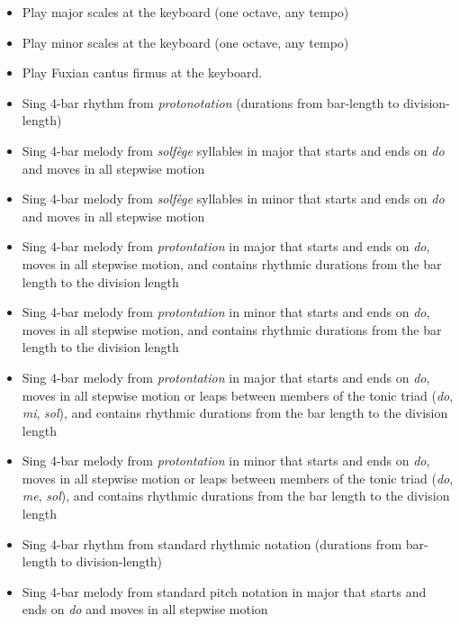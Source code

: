 \begin{itemize}
\item Play major scales at the keyboard (one octave, any tempo)

\item Play minor scales at the keyboard (one octave, any tempo)

\item Play Fuxian cantus firmus at the keyboard.

\item Sing 4-bar rhythm from \emph{protonotation} (durations from bar-length to division-length)

\item Sing 4-bar melody from \emph{solfège} syllables in major that starts and ends on \emph{do} and moves in all stepwise motion

\item Sing 4-bar melody from \emph{solfège} syllables in minor that starts and ends on \emph{do} and moves in all stepwise motion

\item Sing 4-bar melody from \emph{protontation} in major that starts and ends on \emph{do}, moves in all stepwise motion, and contains rhythmic durations from the bar length to the division length

\item Sing 4-bar melody from \emph{protontation} in minor that starts and ends on \emph{do}, moves in all stepwise motion, and contains rhythmic durations from the bar length to the division length

\item Sing 4-bar melody from \emph{protontation} in major that starts and ends on \emph{do}, moves in all stepwise motion or leaps between members of the tonic triad (\emph{do}, \emph{mi}, \emph{sol}), and contains rhythmic durations from the bar length to the division length

\item Sing 4-bar melody from \emph{protontation} in minor that starts and ends on \emph{do}, moves in all stepwise motion or leaps between members of the tonic triad (\emph{do}, \emph{me}, \emph{sol}), and contains rhythmic durations from the bar length to the division length

\item Sing 4-bar rhythm from standard rhythmic notation (durations from bar-length to division-length)

\item Sing 4-bar melody from standard pitch notation in major that starts and ends on \emph{do} and moves in all stepwise motion


\end{itemize}

